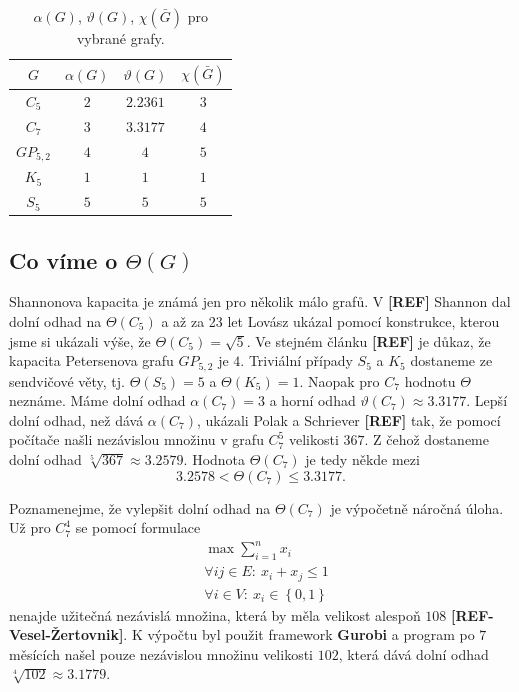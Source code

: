 \begin{table}[h!]
    \centering
    \begin{tabular}{ c | c c c }
        $G$        & $\alpha(G)$ & $\vartheta(G)$ & $\chi(\bar{G})$ \\
        \hline
        $C_5$      & $2$         & $2.2361$       & $3$ \\  
        $C_7$      & $3$         & $3.3177$       & $4$ \\
        $GP_{5,2}$ & $4$         & $4$            & $5$ \\
        $K_5$      & $1$         & $1$            & $1$ \\
        $S_5$      & $5$         & $5$            & $5$
    \end{tabular}
    \caption{$\alpha(G)$, $\vartheta(G)$, $\chi(\bar{G})$ pro vybrané grafy.}
    \label{tab:sandwitch}
\end{table}

\subsection*{Co víme o $\Theta(G)$}

Shannonova kapacita je známá jen pro několik málo grafů. V \textbf{[REF]} Shannon dal dolní odhad na $\Theta(C_5)$ a až za 23 let Lovász ukázal pomocí konstrukce, kterou jsme si ukázali výše, že $\Theta(C_5) = \sqrt{5}$. Ve stejném článku \textbf{[REF]} je důkaz, že kapacita Petersenova grafu $GP_{5,2}$ je $4$. Triviální případy $S_5$ a $K_5$ dostaneme ze sendvičové věty, tj. $\Theta(S_5) = 5$ a $\Theta(K_5) = 1$. Naopak pro $C_7$ hodnotu $\Theta$ neznáme. Máme dolní odhad $\alpha(C_7) = 3$ a horní odhad $\vartheta(C_7) \approx 3.3177$. Lepší dolní odhad, než dává $\alpha(C_7)$, ukázali Polak a Schriever \textbf{[REF]} tak, že pomocí počítače našli nezávislou množinu v grafu $C_7^5$ velikosti $367$. Z čehož dostaneme dolní odhad $\sqrt[5]{367} \approx 3.2579$. Hodnota $\Theta(C_7)$ je tedy někde mezi
$$
    3.2578 < \Theta(C_7) \leq 3.3177.
$$

Poznamenejme, že vylepšit dolní odhad na $\Theta(C_7)$ je výpočetně náročná úloha. Už pro $C_7^4$ se pomocí formulace
\begin{equation*}
    \begin{split}
        &\max \sum_{i=1}^n x_i \\
        &\forall ij \in E:\ x_i + x_j \leq 1 \\
        &\forall i \in V:\ x_i \in \left\{ 0, 1 \right\}
    \end{split}
\end{equation*}
nenajde užitečná nezávislá množina, která by měla velikost alespoň $108$ \textbf{[REF-Vesel-Žertovnik]}. K výpočtu byl použit framework \textbf{Gurobi} a program po $7$ měsících našel pouze nezávislou množinu velikosti $102$, která dává dolní odhad $\sqrt[4]{102} \approx 3.1779$.

